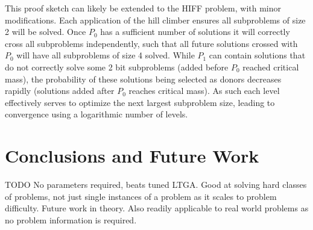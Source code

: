 \documentclass{sig-alternate}
\begin{document}
This proof sketch can likely be extended to the HIFF problem, with minor modifications.
Each application of the hill climber ensures all subproblems of size 2 will be solved.
Once $P_0$ has a sufficient number of solutions it will correctly cross all subproblems
independently, such that all future solutions crossed with $P_0$ will have all subproblems
of size 4 solved.  While $P_1$ can contain solutions that do not correctly solve some 2 bit
subproblems (added before $P_0$ reached critical mass), the probability of these solutions
being selected as donors decreases rapidly (solutions added after $P_0$ reaches critical mass).
As such each level effectively serves to optimize the next largest subproblem size, leading to
convergence using a logarithmic number of levels.


\section{Conclusions and Future Work}
TODO No parameters required, beats tuned LTGA.  Good at solving hard classes
of problems, not just single instances of a problem as it scales to problem difficulty.
Future work in theory.  Also readily applicable to real world problems as no
problem information is required.

%

%
%
\balancecolumns
\end{document}
